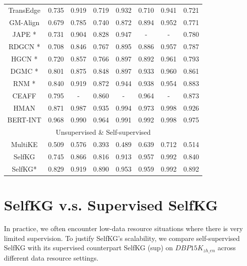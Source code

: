 \documentclass[sigconf]{acmart}
\begin{document}
{\begin{table}
{\begin{tabular}{cccccccc}
\multicolumn{1}{c}{TransEdge \cite{sun2019transedge}}&  0.735 &0.919& 0.719& 0.932& 0.710& 0.941& 0.721\\ 
\multicolumn{1}{c}{GM-Align \cite{xu2019cross}}&  0.679 &0.785 &0.740& 0.872& 0.894& 0.952& 0.771\\ 
\multicolumn{1}{c}{JAPE \cite{sun2017cross}*}& 0.731& 0.904& 0.828& 0.947& -& - &0.780\\ 
\multicolumn{1}{c}{RDGCN \cite{wu2019relation}*}& 0.708& 0.846& 0.767 &0.895& 0.886 &0.957 &0.787\\ 
\multicolumn{1}{c}{HGCN \cite{wu2019jointly}*}& 0.720& 0.857 &0.766 &0.897 &0.892 &0.961& 0.793\\ 
\multicolumn{1}{c}{DGMC \cite{fey2020deep}*}& 0.801& 0.875 &0.848& 0.897 &0.933 &0.960 &0.861\\ 
\multicolumn{1}{c}{RNM \cite{zhu2021relation}*}& 0.840& 0.919 &0.872& 0.944& 0.938& 0.954& 0.883\\ 
\multicolumn{1}{c}{CEAFF \cite{zeng2020collective}}& 0.795& - &0.860& - &0.964 &- &0.873\\ 
\multicolumn{1}{c}{HMAN \cite{yang2019aligning}}& 0.871 &0.987& 0.935& 0.994 &0.973& 0.998 &0.926\\ 
\multicolumn{1}{c}{BERT-INT \cite{tang2020bert}}& 0.968& 0.990& 0.964 &0.991 &0.992& 0.998& 0.975\\ 
\midrule %
\multicolumn{8}{c}{\multirow{1}{*}{Unsupervised \& Self-supervised}}\\
\midrule %
\multicolumn{1}{c}{MultiKE \cite{zhang2019multi}}& 0.509& 0.576& 0.393& 0.489& 0.639& 0.712 &0.514\\ 
\multicolumn{1}{c}{SelfKG}&  0.745& 0.866 &0.816& 0.913& 0.957& 0.992 &0.840\\
\multicolumn{1}{c}{SelfKG*}&  0.829& 0.919& 0.890 &0.953& 0.959& 0.992 &0.892\\
\bottomrule %
\end{tabular}
}
\end{table}
\section{SelfKG v.s. Supervised SelfKG}

In practice, we often encounter low-data resource situations where there is very limited supervision. To justify SelfKG’s scalability, we compare self-supervised SelfKG with its supervised counterpart SelfKG (sup) on $DBP15K_{zh\_en}$ across different data resource settings.

}
\end{document}
